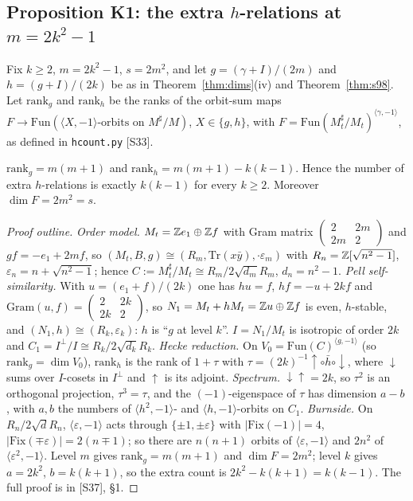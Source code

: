\subsection{Proposition K1: the extra $h$-relations at $m=2k^2-1$}\label{sec:rev7K1}
Fix $k\ge2$, $m=2k^2-1$, $s=2m^2$, and let $g=(\gamma+I)/(2m)$ and $h=(g+I)/(2k)$ be as in Theorem~\ref{thm:dims}(iv) and Theorem~\ref{thm:s98}. Let $\mathrm{rank}_g$ and $\mathrm{rank}_h$ be the ranks of the orbit-sum maps $F\to\mathrm{Fun}(\langle X,-1\rangle\text{-orbits on }M^\sharp/M)$, $X\in\{g,h\}$, with $F=\mathrm{Fun}(M_t^\sharp/M_t)^{\langle\gamma,-1\rangle}$, as defined in \texttt{hcount.py} [S33].
\begin{propKone}[\src{37}, \S1]\label{prop:K1}
$\mathrm{rank}_g=m(m+1)$ and $\mathrm{rank}_h=m(m+1)-k(k-1)$. Hence the number of extra $h$-relations is exactly $k(k-1)$ for every $k\ge2$. Moreover $\dim F=2m^2=s$.
\end{propKone}
\begin{proof}[Proof outline]
\emph{Order model.} $M_t=\mathbb{Z} e_1\oplus\mathbb{Z} f$ with Gram matrix $\left(\begin{smallmatrix}2&2m\\2m&2\end{smallmatrix}\right)$ and $gf=-e_1+2mf$, so $(M_t,B,g)\cong(R_m,\mathrm{Tr}(x\bar y),\cdot\varepsilon_m)$ with $R_n=\mathbb{Z}[\sqrt{n^2-1}]$, $\varepsilon_n=n+\sqrt{n^2-1}$; hence $C:=M_t^\sharp/M_t\cong R_m/2\sqrt{d_m}R_m$, $d_n=n^2-1$.
\emph{Pell self-similarity.} With $u=(e_1+f)/(2k)$ one has $hu=f$, $hf=-u+2kf$ and $\mathrm{Gram}(u,f)=\left(\begin{smallmatrix}2&2k\\2k&2\end{smallmatrix}\right)$, so $N_1=M_t+hM_t=\mathbb{Z} u\oplus\mathbb{Z} f$ is even, $h$-stable, and $(N_1,h)\cong(R_k,\varepsilon_k)$: $h$ is ``$g$ at level $k$''. $I=N_1/M_t$ is isotropic of order $2k$ and $C_1=I^\perp/I\cong R_k/2\sqrt{d_k}R_k$.
\emph{Hecke reduction.} On $V_0=\mathrm{Fun}(C)^{\langle g,-1\rangle}$ (so $\mathrm{rank}_g=\dim V_0$), $\mathrm{rank}_h$ is the rank of $1+\tau$ with $\tau=(2k)^{-1}\uparrow\circ\bar h\circ\downarrow$, where $\downarrow$ sums over $I$-cosets in $I^\perp$ and $\uparrow$ is its adjoint.
\emph{Spectrum.} $\downarrow\uparrow=2k$, so $\tau^2$ is an orthogonal projection, $\tau^3=\tau$, and the $(-1)$-eigenspace of $\tau$ has dimension $a-b$, with $a,b$ the numbers of $\langle h^2,-1\rangle$- and $\langle h,-1\rangle$-orbits on $C_1$.
\emph{Burnside.} On $R_n/2\sqrt dR_n$, $\langle\varepsilon,-1\rangle$ acts through $\{\pm1,\pm\varepsilon\}$ with $|\mathrm{Fix}(-1)|=4$, $|\mathrm{Fix}(\mp\varepsilon)|=2(n\mp1)$; so there are $n(n+1)$ orbits of $\langle\varepsilon,-1\rangle$ and $2n^2$ of $\langle\varepsilon^2,-1\rangle$. Level $m$ gives $\mathrm{rank}_g=m(m+1)$ and $\dim F=2m^2$; level $k$ gives $a=2k^2$, $b=k(k+1)$, so the extra count is $2k^2-k(k+1)=k(k-1)$. The full proof is in [S37], \S1.
\end{proof}
